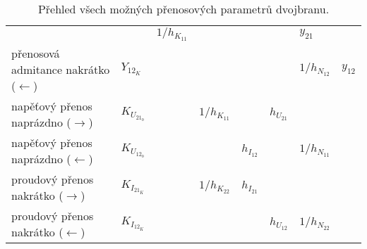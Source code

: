 \begin{table*}[!t]
{\begin{tabular}{|l|l|l|l|l|l|l|l|}
                  & & \(1/h_{K_{11}}\) & & & & \(y_{21}\)     \\
            přenosová admitance nakrátko (\(\leftarrow\))
            & \(Y_{12_K}\) 
                  & & & & & \(1/h_{N_{12}}\) & \(y_{12}\)     \\
            napěťový přenos naprázdno (\(\rightarrow\))
            & \(K_{U_{21_0}}\) 
                  & & \(1/h_{K_{11}}\) & & \(h_{U_{21}}\) & & \\
            napěťový přenos naprázdno (\(\leftarrow\))
            & \(K_{U_{12_0}}\) 
                  & & & \(h_{I_{12}}\) & & \(1/h_{N_{11}}\) & \\
            proudový přenos nakrátko (\(\rightarrow\))
            & \(K_{I_{21_K}}\) 
                  & & \(1/h_{K_{22}}\) & \(h_{I_{21}}\) & & & \\
            proudový přenos nakrátko (\(\leftarrow\))
            & \(K_{I_{12_K}}\) 
                  & & & & \(h_{U_{12}}\) & \(1/h_{N_{22}}\) & \\
            \hline
          \end{tabular}
        }
        \caption{Přehled všech možných přenosových parametrů dvojbranu.}
        \label{ES:tab_topol01}
      \end{table*}

        

